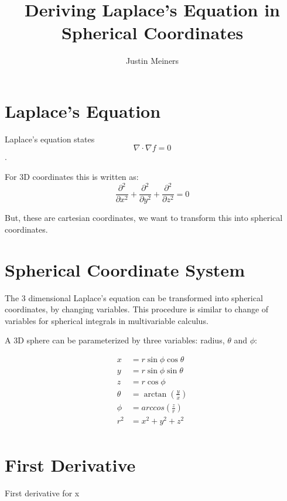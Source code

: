 \documentclass{article}
\begin{document}
\newtheorem{theorem}{Theorem}
\newtheorem{definition}{Definition}


\title{Deriving Laplace's Equation in Spherical Coordinates}
\author{Justin Meiners}

\maketitle

\section{Laplace's Equation}

Laplace's equation states
$$\nabla\cdot\nabla f=0$$.

For 3D coordinates this is written as:
$$\frac{\partial^{2}}{\partial x^{2}}+\frac{\partial^{2}}{\partial y^{2}}+\frac{\partial^{2}}{\partial z^{2}}=0$$


But, these are cartesian coordinates, we want to transform this into spherical coordinates.

\section{Spherical Coordinate System}

The 3 dimensional Laplace's equation can be transformed into spherical coordinates, by changing variables. This procedure is similar to change of variables for spherical integrals in multivariable calculus.

A 3D sphere can be parameterized by three variables: radius, $\theta$ and $\phi$:

\begin{equation}
\begin{split}
x&=r\sin\phi\cos\theta \\
y&=r\sin\phi\sin\theta \\
z&=r\cos\phi \\
\theta&=\arctan(\frac{y}{x}) \\
\phi&=arccos(\frac{z}{r}) \\
r^{2}&=x^{2}+y^{2}+z^{2} \\
\end{split}
\end{equation}

\section{First Derivative}

First derivative for x
\end{document}
